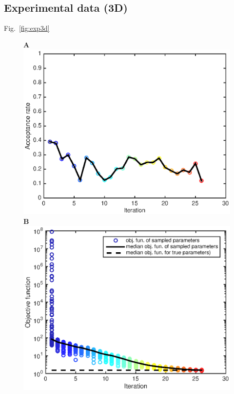 \documentclass[10pt,letterpaper]{article}
\begin{document}
\subsection*{Experimental data (3D)}
Fig.~\ref{fig:exp3d} 

\begin{figure}[htbp]
\begin{minipage}[t]{0.33\textwidth}
\textbf{A}
\includegraphics[width=\textwidth]{Data/Tumor3dGCKI67ECM-acceptanceRate.eps}\\
\textbf{B}
\includegraphics[width=\textwidth]{Data/Tumor3dGCKI67ECM-objFunc.eps}

\end{minipage}
\end{figure}
\end{document}
